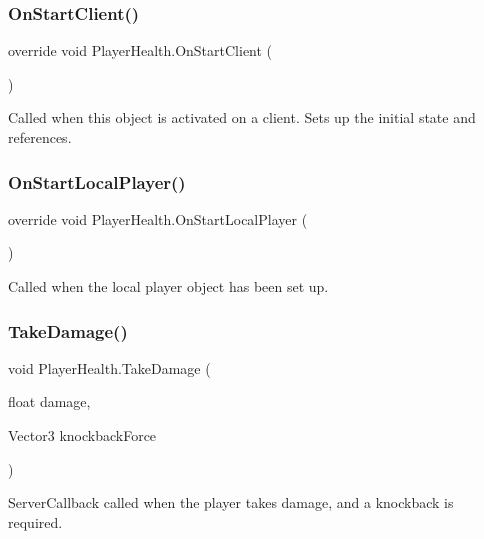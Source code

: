 \subsubsection{\texorpdfstring{On\+Start\+Client()}{OnStartClient()}}
{\footnotesize\ttfamily override void Player\+Health.\+On\+Start\+Client (\begin{DoxyParamCaption}{ }\end{DoxyParamCaption})}



Called when this object is activated on a client. Sets up the initial state and references. 

\hypertarget{class_player_health_aeff542368fc096a315d75a358055b058}{}\label{class_player_health_aeff542368fc096a315d75a358055b058} 
\subsubsection{\texorpdfstring{On\+Start\+Local\+Player()}{OnStartLocalPlayer()}}
{\footnotesize\ttfamily override void Player\+Health.\+On\+Start\+Local\+Player (\begin{DoxyParamCaption}{ }\end{DoxyParamCaption})}



Called when the local player object has been set up. 

\hypertarget{class_player_health_a4572180d6148cb25bced17d5990927aa}{}\label{class_player_health_a4572180d6148cb25bced17d5990927aa} 
\subsubsection{\texorpdfstring{Take\+Damage()}{TakeDamage()}\hspace{0.1cm}{\footnotesize\ttfamily [1/2]}}
{\footnotesize\ttfamily void Player\+Health.\+Take\+Damage (\begin{DoxyParamCaption}\item[{float}]{damage,  }\item[{Vector3}]{knockback\+Force }\end{DoxyParamCaption})}



Server\+Callback called when the player takes damage, and a knockback is required. 



